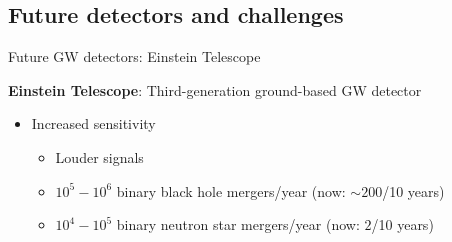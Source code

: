 \documentclass[usenames,dvipsnames,t]{beamer}
\begin{document}
\subsection{Future detectors and challenges}

\begin{frame}{Future GW detectors: Einstein Telescope}
  \def\x{3mm}
  \def\y{2mm}
  \def\z{1mm}

  \textbf{Einstein Telescope}: Third-generation ground-based GW detector~\cite{ET:2019dnz, Abac:2025saz}


  \begin{itemize}
    \item<2-> Increased sensitivity
    
    \begin{itemize}
      \item Louder signals
      
      \vspace{\z}

      \item $10^{5} - 10^{6}$ binary black hole mergers/year (now: $\sim 200$/10 years)
      
      \vspace{\z}
      
      \item $10^{4} - 10^{5}$ binary neutron star mergers/year (now: $2$/10 years)

      \vspace{\z}
      

\end{itemize}
\end{itemize}
\end{frame}
\end{document}
